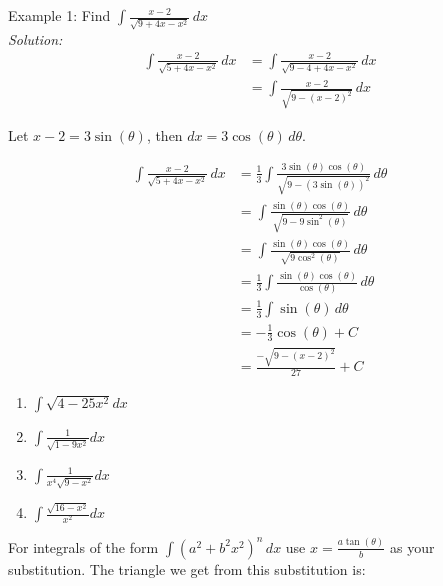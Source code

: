 \documentclass[16pt]{article}
\theoremstyle{remark}
\begin{document}
\begin{mdframed}[style=TheoremFrame]
Example 1: Find $\displaystyle{\int \frac{x-2}{\sqrt{9+4x-x^2}}\, dx  }$\\

\textit{Solution:}
\begin{align*}
\int \frac{x-2}{\sqrt{5+4x-x^2}}\, dx  &= \int \frac{x-2}{\sqrt{9-4+4x-x^2}}\, dx\\[1.5ex]
&= \int \frac{x-2}{\sqrt{9-(x-2)^2}}\, dx
\end{align*}
\begin{center}
Let $\displaystyle{x-2 = 3\sin(\theta)}$, then $dx = 3 \cos(\theta)\, d\theta$.
\end{center}
\begin{align*}
\int \frac{x-2}{\sqrt{5+4x-x^2}}\, dx  &= \frac{1}{3} \int \frac{3\sin(\theta)\cos(\theta)}{\sqrt{9 - (3\sin(\theta))^2}}\, d\theta\\[1.5ex]
&= \int \frac{\sin(\theta)\cos(\theta)}{\sqrt{9 - 9\sin^2(\theta)}}\, d\theta\\[1.5ex]
&= \int \frac{\sin(\theta)\cos(\theta)}{\sqrt{9\cos^2(\theta)}}\, d\theta\\[1.5ex]
&= \frac{1}{3}\int \frac{\sin(\theta)\cos(\theta)}{\cos(\theta)}\, d\theta\\[1.5ex]
&= \frac{1}{3} \int \sin(\theta) \, d\theta\\[1.5ex]
&= -\frac{1}{3} \cos(\theta) + C\\[1.5ex]
&= \frac{-\sqrt{9-(x-2)^2}}{27} + C
\end{align*}
\end{mdframed}
\newpage
\begin{enumerate}

\item $\displaystyle{\int \sqrt{4-25x^2} dx}$
\vspace{8cm}

\item $\displaystyle{\int \frac{1}{\sqrt{1-9x^2}} dx}$
\vspace{8cm}
\newpage
\item $\displaystyle{\int \frac{1}{x^4\sqrt{9-x^2}} dx}$
\vspace{9cm}
\item $\displaystyle{\int \frac{\sqrt{16-x^2}}{x^2} dx}$
\vspace{4cm}
\newpage

\end{enumerate}

For integrals of the form $\displaystyle{\int (a^2 +b^2x^2)^n \,dx}$ use $\displaystyle{x=\frac{a\tan(\theta)}{b}}$ as your substitution. The triangle we get from this substitution is:
\end{document}
